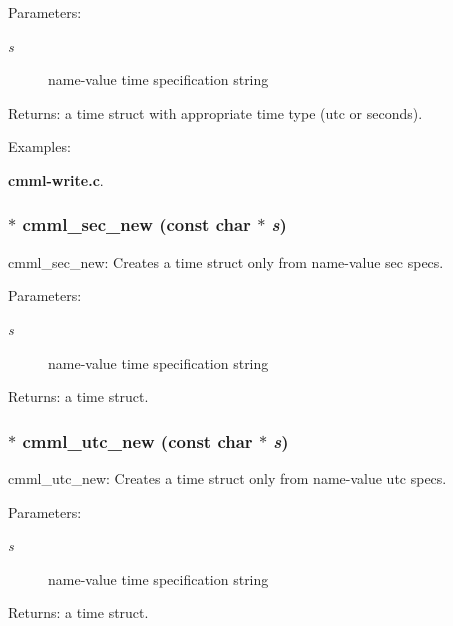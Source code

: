 \begin{Desc}
\item[Parameters:]
\begin{description}
\item[{\em s}]name-value time specification string\end{description}
\end{Desc}
\begin{Desc}
\item[Returns:]a time struct with appropriate time type (utc or seconds). \end{Desc}
\begin{Desc}
\item[Examples: ]\par
{\bf cmml-write.c}.\end{Desc}
\subsubsection{$\ast$ cmml\_\-sec\_\-new (const char $\ast$ {\em s})}\label{cmml_8h_a98}


cmml\_\-sec\_\-new: Creates a time struct only from name-value sec specs.

\begin{Desc}
\item[Parameters:]
\begin{description}
\item[{\em s}]name-value time specification string\end{description}
\end{Desc}
\begin{Desc}
\item[Returns:]a time struct. \end{Desc}
\subsubsection{$\ast$ cmml\_\-utc\_\-new (const char $\ast$ {\em s})}\label{cmml_8h_a99}


cmml\_\-utc\_\-new: Creates a time struct only from name-value utc specs.

\begin{Desc}
\item[Parameters:]
\begin{description}
\item[{\em s}]name-value time specification string\end{description}
\end{Desc}
\begin{Desc}
\item[Returns:]a time struct. \end{Desc}
